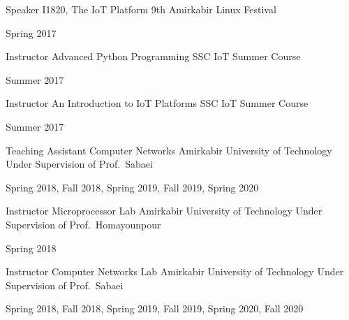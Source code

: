 \begin{cventries}
  \cventry%
    {Speaker} %
    {I1820, The IoT Platform} %
    {9th Amirkabir Linux Festival} %
    {} %
    {%
      \begin{cvitems} %
        Spring 2017
      \end{cvitems}
    }

  \cventry%
    {Instructor} %
    {Advanced Python Programming} %
    {SSC IoT Summer Course} %
    {} %
    {%
      \begin{cvitems} %
        Summer 2017
      \end{cvitems}
    }

  \cventry%
    {Instructor} %
    {An Introduction to IoT Platforms} %
    {SSC IoT Summer Course} %
    {} %
    {%
      \begin{cvitems} %
        Summer 2017
      \end{cvitems}
    }

  \cventry%
    {Teaching Assistant} %
    {Computer Networks} %
    {Amirkabir University of Technology} %
    {Under Supervision of Prof.\ Sabaei} %
    {%
      \begin{cvitems} %
        Spring 2018, Fall 2018, Spring 2019, Fall 2019, Spring 2020
      \end{cvitems}
    }

  \cventry%
    {Instructor} %
    {Microprocessor Lab} %
    {Amirkabir University of Technology} %
    {Under Supervision of Prof.\ Homayounpour} %
    {%
      \begin{cvitems} %
        Spring 2018
      \end{cvitems}
    }

  \cventry%
    {Instructor} %
    {Computer Networks Lab} %
    {Amirkabir University of Technology} %
    {Under Supervision of Prof.\ Sabaei} %
    {%
      \begin{cvitems} %
        Spring 2018, Fall 2018, Spring 2019, Fall 2019, Spring 2020, Fall 2020
      \end{cvitems}
    }


\end{cventries}

